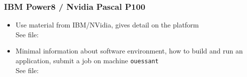 \begin{frame}
  \frametitle{IBM Power8 / Nvidia Pascal P100}

  \begin{itemize}
  \item Use material from IBM/NVidia, gives detail on the platform\\
      See file: 
    \item Minimal information about software environment, how to build and run an application, submit a job on machine \texttt{ouessant}\\
      See file: 
  \end{itemize}

\end{frame}
